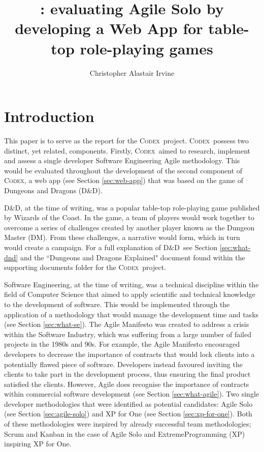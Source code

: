 \documentclass[final]{cmpreport}
\title{\Codex: evaluating Agile Solo by developing a Web App for table-top role-playing games}
\author{Christopher Alastair Irvine}
\newcommand{\WotC}{Wizards of the Coast}
\newcommand{\dnd}{D\&D}
\newcommand{\Codex}{\textsc{Codex}}
\begin{document}
	
	\section{Introduction} \label{sec:introduction}
	This paper is to serve as the report for the \Codex \ project. \Codex \ possess two distinct, yet related, components. Firstly, \Codex \ aimed to research, implement and assess a single developer Software Engineering Agile methodology. This would be evaluated throughout the development of the second component of \Codex, a web app (see Section \ref{sec:web-app}) that was based on the game of Dungeons and Dragons (\dnd). 
	
	\dnd, at the time of writing, was a popular table-top role-playing game published by \WotC. In the game, a team of players would work together to overcome a series of challenges created by another player known as the Dungeon Master (DM). From these challenges, a narrative would form, which in turn would create a campaign. For a full explanation of \dnd \ see Section \ref{sec:what-dnd} and the ``Dungeons and Dragons Explained" document found within the supporting documents folder for the \Codex \ project. 
	
	Software Engineering, at the time of writing, was a technical discipline within the field of Computer Science that aimed to apply scientific and technical knowledge to the development of software. This would be implemented through the application of a methodology that would manage the development time and tasks (see Section \ref{sec:what-se}). The Agile Manifesto was created to address a crisis within the Software Industry, which was suffering from a large number of failed projects in the 1980s and 90s. For example, the Agile Manifesto encouraged developers to decrease the importance of contracts that would lock clients into a potentially flawed piece of software. Developers instead favoured inviting the clients to take part in the development process, thus ensuring the final product satisfied the clients. However, Agile does recognise the importance of contracts within commercial software development (see Section \ref{sec:what-agile}). Two single developer methodologies that were identified as potential candidates: Agile Solo (see Section \ref{sec:agile-solo}) and XP for One (see Section \ref{sec:xp-for-one}). Both of these methodologies were inspired by already successful team methodologies; Scrum and Kanban in the case of Agile Solo and ExtremeProgramming (XP) inspiring XP for One. 
	
\end{document}
